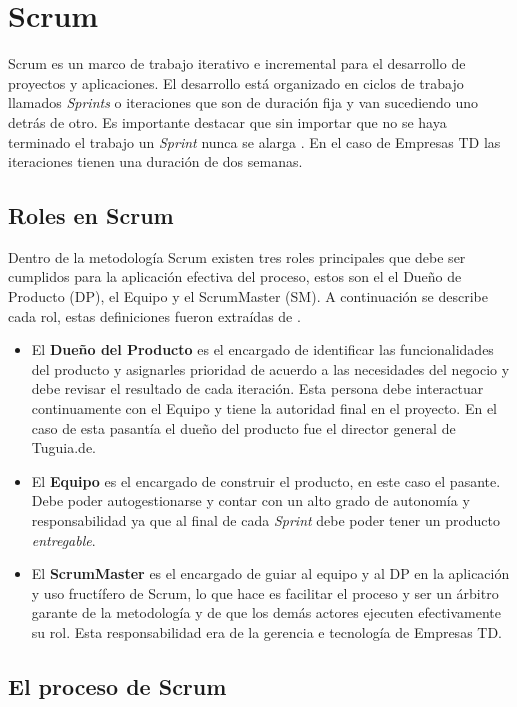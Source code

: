 \section{Scrum} \label{sect:Scrum}

Scrum es un marco de trabajo iterativo e incremental para el desarrollo de proyectos y aplicaciones. El desarrollo está organizado en ciclos de trabajo llamados \textit{Sprints} o iteraciones que son de duración fija y van sucediendo uno detrás de otro. Es importante destacar que sin importar que no se haya terminado el trabajo un \textit{Sprint} nunca se alarga \cite{DBLV09}. En el caso de Empresas TD las iteraciones tienen una duración de dos semanas.

\subsection{Roles en Scrum} 

Dentro de la metodología Scrum existen tres roles principales que debe ser cumplidos para la aplicación efectiva del proceso, estos son el el Dueño de Producto (DP), el Equipo y el ScrumMaster (SM). A continuación se describe cada rol, estas definiciones fueron extraídas de \cite{DBLV09}.

\begin{itemize}
\item El \textbf{Dueño del Producto} es el encargado de identificar las funcionalidades del producto y asignarles prioridad de acuerdo a las necesidades del negocio y debe revisar el resultado de cada iteración. Esta persona debe interactuar continuamente con el Equipo y tiene la autoridad final en el proyecto. En el caso de esta pasantía el dueño del producto fue el director general de Tuguia.de.
\item El \textbf{Equipo} es el encargado de construir el producto, en este caso el pasante. Debe poder autogestionarse y contar con un alto grado de autonomía y responsabilidad ya que al final de cada \textit{Sprint} debe poder tener un producto \textit{entregable}.
\item El \textbf{ScrumMaster} es el encargado de guiar al equipo y al DP en la aplicación y uso fructífero de Scrum, lo que hace es facilitar el proceso y ser un árbitro garante de la metodología y de que los demás actores ejecuten efectivamente su rol. Esta responsabilidad era de la gerencia e tecnología de Empresas TD.
\end{itemize} 

\subsection{El proceso de Scrum}


